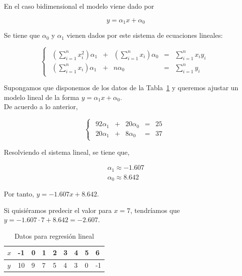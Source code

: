 En el caso bidimensional el modelo viene dado por

\begin{equation}
y = \alpha_1 x + \alpha_0
\end{equation}

Se tiene que $\alpha_0$ y $\alpha_1$ vienen dados por este sistema de ecuaciones lineales:

\begin{equation}
\begin{cases}
\begin{array}{ccccc}
\left(\sum_{i=1}^{n} x_i^2\right) \alpha_1 & + & \left(\sum_{i=1}^{n} x_i\right) \alpha_0 & = & \sum_{i=1}^{n} x_i y_i \\
 \left(\sum_{i=1}^{n} x_i\right) \alpha_1 & + & n \alpha_0 & = & \sum_{i=1}^{n} y_i
\end{array}
\end{cases}
\end{equation}

\begin{ejemplo}
	Supongamos que disponemos de los datos de la Tabla~\ref{tbl:regresion_lineal} y queremos ajustar un modelo lineal de la forma $y = \alpha_1 x + \alpha_0$.\\
	
	De acuerdo a lo anterior,
	
	\begin{equation*}
	\begin{cases}
	\begin{array}{ccccc}
	92 \alpha_1 & + & 20 \alpha_0 & = & 25 \\
	20 \alpha_1 & + &  8 \alpha_0 & = & 37
	\end{array}
	\end{cases}
	\end{equation*}
	
	Resolviendo el sistema lineal, se tiene que,
	
	\begin{eqnarray*}
	\alpha_1 \approx -1.607 \\
	\alpha_0 \approx  8.642
	\end{eqnarray*}
	
	Por tanto, $y = -1.607x + 8.642$.
	
	Si quisiéramos predecir el valor para $x=7$, tendríamos que $y = -1.607\cdot 7 + 8.642 = -2.607$.
	
	\begin{table}[htbp!]
		\centering
		\caption{Datos para regresión lineal}
		\label{tbl:regresion_lineal}
		\begin{tabular}{@{}lllllllll@{}}
			\toprule
			$x$ & -1 & 0 & 1 & 2 & 3 & 4 & 5 & 6  \\ \midrule
			$y$ & 10 & 9 & 7 & 5 & 4 & 3 & 0 & -1 \\ \bottomrule
		\end{tabular}
	\end{table}
	
\end{ejemplo}

